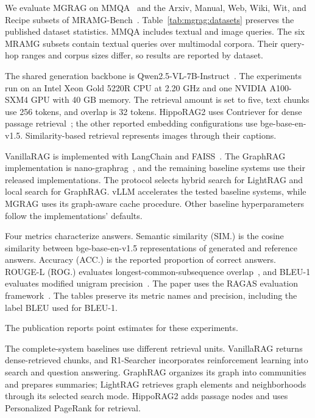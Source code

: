 We evaluate MGRAG on MMQA~\cite{mgrag-talmor2021multimodalqa} and the Arxiv, Manual, Web, Wiki, Wit, and Recipe subsets of MRAMG-Bench~\cite{mgrag-yu2025mramg}. Table~\ref{tab:mgrag:datasets} preserves the published dataset statistics. MMQA includes textual and image queries. The six MRAMG subsets contain textual queries over multimodal corpora. Their query-hop ranges and corpus sizes differ, so results are reported by dataset.



The shared generation backbone is Qwen2.5-VL-7B-Instruct~\cite{mgrag-bai2025qwen2}. The experiments run on an Intel Xeon Gold 5220R CPU at 2.20 GHz and one NVIDIA A100-SXM4 GPU with 40 GB memory. The retrieval amount is set to five, text chunks use 256 tokens, and overlap is 32 tokens. HippoRAG2 uses Contriever for dense passage retrieval~\cite{mgrag-izacardunsupervised}; the other reported embedding configurations use bge-base-en-v1.5. Similarity-based retrieval represents images through their captions.

VanillaRAG is implemented with LangChain and FAISS~\cite{mgrag-douze2024faiss}. The GraphRAG implementation is nano-graphrag~\cite{mgrag-nanographrag}, and the remaining baseline systems use their released implementations. The protocol selects hybrid search for LightRAG and local search for GraphRAG. vLLM accelerates the tested baseline systems, while MGRAG uses its graph-aware cache procedure. Other baseline hyperparameters follow the implementations' defaults.

Four metrics characterize answers. Semantic similarity (SIM.) is the cosine similarity between bge-base-en-v1.5 representations of generated and reference answers. Accuracy (ACC.) is the reported proportion of correct answers. ROUGE-L (ROG.) evaluates longest-common-subsequence overlap~\cite{mgrag-lin2004rouge}, and BLEU-1 evaluates modified unigram precision~\cite{mgrag-papineni2002bleu}. The paper uses the RAGAS evaluation framework~\cite{mgrag-es2024ragas}. The tables preserve its metric names and precision, including the label BLEU used for BLEU-1.

The publication reports point estimates for these experiments.

The complete-system baselines use different retrieval units. VanillaRAG returns dense-retrieved chunks, and R1-Searcher incorporates reinforcement learning into search and question answering. GraphRAG organizes its graph into communities and prepares summaries; LightRAG retrieves graph elements and neighborhoods through its selected search mode. HippoRAG2 adds passage nodes and uses Personalized PageRank for retrieval.

